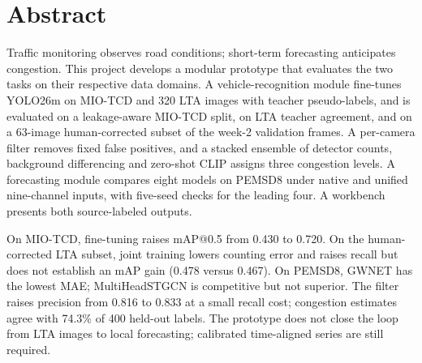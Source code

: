 \section*{Abstract}

Traffic monitoring observes road conditions; short-term forecasting anticipates
congestion. This project develops a modular prototype that evaluates the two
tasks on their respective data domains. A vehicle-recognition module fine-tunes
YOLO26m on MIO-TCD and 320 LTA images with teacher pseudo-labels, and is
evaluated on a leakage-aware MIO-TCD split, on LTA teacher agreement, and on a
63-image human-corrected subset of the week-2 validation frames. A per-camera
filter removes fixed false positives, and a stacked ensemble of detector counts,
background differencing and zero-shot CLIP assigns three congestion levels. A
forecasting module compares eight models on PEMSD8 under native and unified
nine-channel inputs, with five-seed checks for the leading four. A workbench
presents both source-labeled outputs.

On MIO-TCD, fine-tuning raises mAP@0.5 from 0.430 to 0.720. On the
human-corrected LTA subset, joint training lowers counting error and raises
recall but does not establish an mAP gain (0.478 versus 0.467). On PEMSD8, GWNET
has the lowest MAE; MultiHeadSTGCN is competitive but not superior. The filter
raises precision from 0.816 to 0.833 at a small recall cost; congestion
estimates agree with 74.3\% of 400 held-out labels. The prototype does not close
the loop from LTA images to local forecasting; calibrated time-aligned series
are still required.
